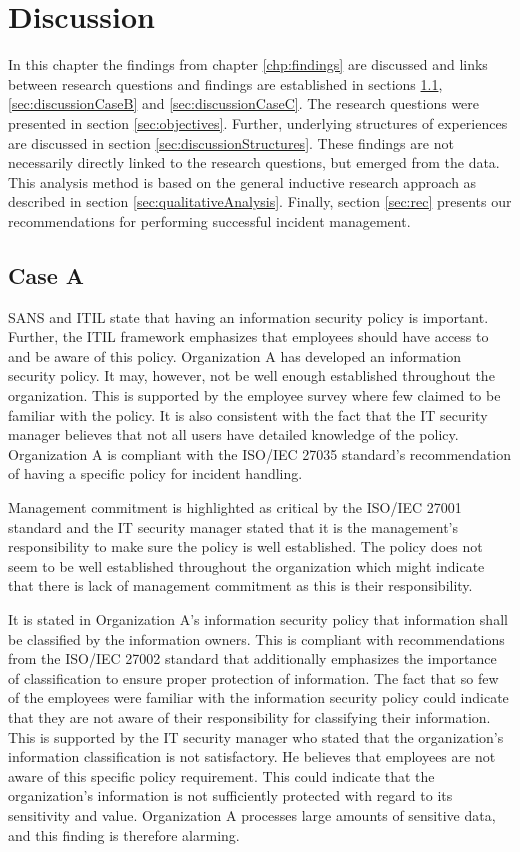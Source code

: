 \chapter{Discussion}
\label{chp:discussion}
In this chapter the findings from chapter \ref{chp:findings} are discussed and links between research questions and findings are established in sections \ref{sec:discussionCaseA}, \ref{sec:discussionCaseB} and \ref{sec:discussionCaseC}. The research questions were presented in section \ref{sec:objectives}. Further, underlying structures of experiences  are discussed in section \ref{sec:discussionStructures}. These findings are not necessarily  directly linked to the research questions, but emerged from the data. This analysis method is based on the general inductive research approach as described in section \ref{sec:qualitativeAnalysis}. Finally, section \ref{sec:rec} presents our recommendations for performing successful incident management.  

\section{Case A}
\label{sec:discussionCaseA}
SANS and \acs{ITIL} state that having an information security policy is important. Further, the \acs{ITIL} framework emphasizes that employees should have access to and be aware of this policy. Organization A has developed an information security policy. It may, however, not be well enough established throughout the organization. This is supported by the employee survey where few claimed to be familiar with the policy. It is also consistent with the fact that the IT security manager believes that not all users have detailed knowledge of the policy. Organization A is compliant with the ISO/IEC 27035 standard's recommendation of having a specific policy for incident handling. 

Management commitment is highlighted as critical by the ISO/IEC 27001 standard and the IT security manager stated that it is the management's responsibility to make sure the policy is well established. The policy does not seem to be well established throughout the organization which might indicate that there is lack of management commitment as this is their responsibility.

It is stated in Organization A's information security policy that information shall be classified by the information owners. This is compliant with recommendations from the ISO/IEC 27002 standard that additionally emphasizes the importance of classification to ensure proper protection of information. The fact that so few of the employees were familiar with the information security policy could indicate that they are not aware of their responsibility for classifying their information. This is supported by the IT security manager who stated that the organization's information classification is not satisfactory. He believes that employees are not aware of this specific policy requirement. This could indicate that the organization's information is not sufficiently protected with regard to its sensitivity and value. Organization A processes large amounts of sensitive data, and this finding is therefore alarming.

